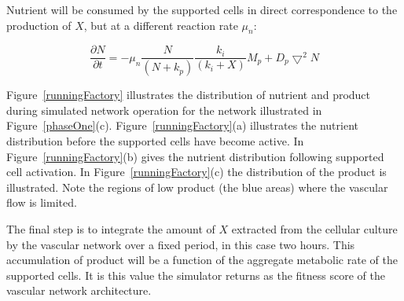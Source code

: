 %

Nutrient will be consumed by the supported cells in direct correspondence to the
production of $X$, but at a different reaction rate $\mu_n$:

\begin{equation}
    \frac{\partial N}{\partial t}=-\mu _{n}  \frac{N}{(N+k_p)} \frac{k_i}{(k_i+X)}
    M_p + D_{p}\bigtriangledown^{2} N
    \label{nutrientConsumption}
\end{equation}

Figure~\ref{runningFactory} illustrates the distribution of nutrient and product
during simulated network operation for the network illustrated in
Figure~\ref{phaseOne}(c).
Figure~\ref{runningFactory}(a) illustrates the nutrient distribution before the
supported cells have become active. In Figure~\ref{runningFactory}(b) gives the
nutrient distribution following supported cell activation. In
Figure~\ref{runningFactory}(c) the distribution of the product is illustrated. Note
the regions of low product (the blue areas) where the vascular flow is limited.

The final step is to integrate the amount of $X$ extracted from the cellular culture
by the vascular network over a fixed period, in this case two hours. This
accumulation of product will be a function of the aggregate metabolic rate of the
supported cells. It is this value the simulator returns as the fitness score of the vascular network architecture.




